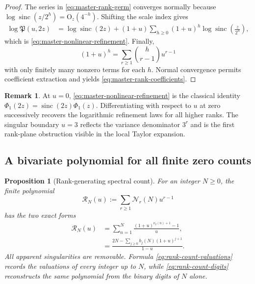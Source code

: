 \documentclass[11pt,a4paper]{article}
\theoremstyle{frontier}
\newtheorem{proposition}[theorem]{Proposition}
\theoremstyle{definition}
\newtheorem{remark}[theorem]{Remark}
\newcommand{\sinc}{\operatorname{sinc}}
\newcommand{\bigO}{\mathrm O}
\begin{document}
\begin{proof}
The series in \eqref{eq:master-rank-germ} converges normally because
$\log\sinc(z/2^h)=\bigO_z(4^{-h})$.  Shifting the scale index gives
\begin{align*}
 \log\mathfrak P(u,2z)
 &=\log\sinc(2z)
 +(1+u)\sum_{h\ge0}(1+u)^h
   \log\sinc\!\left(\frac z{2^h}\right),
\end{align*}
which is \eqref{eq:master-nonlinear-refinement}.  Finally,
\[
 (1+u)^h=\sum_{r\ge1}\binom h{r-1}u^{r-1}
\]
with only finitely many nonzero terms for each $h$.  Normal convergence permits coefficient extraction and yields \eqref{eq:master-rank-coefficients}.
\end{proof}

\begin{remark}
At $u=0$, \eqref{eq:master-nonlinear-refinement} is the classical identity
$\Phi_1(2z)=\sinc(2z)\Phi_1(z)$.  Differentiating with respect to $u$ at zero successively recovers the logarithmic refinement laws for all higher ranks.  The singular boundary $u=3$ reflects the variance denominator $3^r$ and is the first rank-plane obstruction visible in the local Taylor expansion.
\end{remark}

\subsection{A bivariate polynomial for all finite zero counts}

\begin{proposition}[Rank-generating spectral count]\label{prop:rank-count-polynomial}
For an integer $N\ge0$, the finite polynomial
\begin{equation}\label{eq:rank-count-poly-def}
 \mathscr R_N(u):=\sum_{r\ge1}\mathcal N_r(N)u^{r-1}
\end{equation}
has the two exact forms
\begin{align}
 \mathscr R_N(u)
 &=\sum_{n=1}^{N}
   \frac{(1+u)^{\nu_2(n)+1}-1}{u},\label{eq:rank-count-valuations}\\
 &=\frac{2N-\displaystyle\sum_{j\ge0}b_j(N)(1+u)^{j+1}}
 {1-u}.\label{eq:rank-count-digits}
\end{align}
All apparent singularities are removable.  Formula \eqref{eq:rank-count-valuations} records the valuations of every integer up to $N$, while \eqref{eq:rank-count-digits} reconstructs the same polynomial from the binary digits of $N$ alone.
\end{proposition}
\end{document}
